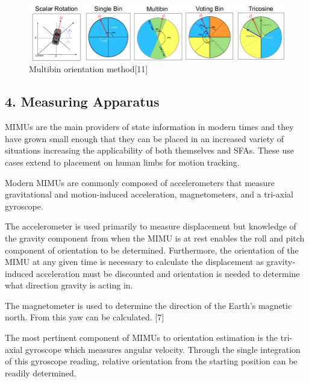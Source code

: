 \documentclass[10pt]{report}
\begin{document}
\begin{figure}[!h]
  \caption{Multibin orientation method[11]}
  \label{fig:multibin}
  \includegraphics[width=1\textwidth]{multibin.PNG}
\end{figure}

\newpage

\subsection*{4. Measuring Apparatus}
MIMUs are the main providers of state information in modern times and they have grown small enough that they can be placed in an increased variety of situations increasing the applicability of both themselves and SFAs. These use cases extend to placement on human limbs for motion tracking.

Modern MIMUs are commonly composed of accelerometers that measure gravitational and motion-induced acceleration, magnetometers, and a tri-axial gyroscope. 

The accelerometer is used primarily to measure displacement but knowledge of the gravity component from when the MIMU is at rest enables the roll and pitch component of orientation to be determined. Furthermore, the orientation of the MIMU at any given time is necessary to calculate the displacement as gravity-induced acceleration must be discounted and orientation is needed to determine what direction gravity is acting in.

The magnetometer is used to determine the direction of the Earth’s magnetic north. From this yaw can be calculated. [7]

The most pertinent component of MIMUs to orientation estimation is the tri-axial gyroscope which measures angular velocity. Through the single integration of this gyroscope reading, relative orientation from the starting position can be readily determined. 
\end{document}
